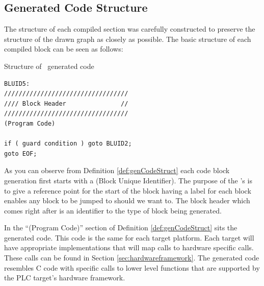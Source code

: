 \subsection{Generated Code Structure}
\label{sec:implementation:struct}
The structure of each compiled section was carefully constructed to preserve the 
structure of the drawn graph as closely as possible. The basic structure of 
each compiled block can be seen as follows:

\begin{definition}
\label{def:genCodeStruct}
Structure of \plcchart \  generated code

\begin{lstlisting}[frame=single]
BLUID5:
//////////////////////////////////
//// Block Header               //
//////////////////////////////////
(Program Code)

if ( guard condition ) goto BLUID2;
goto EOF;
\end{lstlisting}
\end{definition}

As you can observe from Definition \ref{def:genCodeStruct} each code block
generation first starts with a  (Block Unique Identifier).
The purpose of the 's is to give a reference point for the
start of the block having a  label for each block enables
any block to be jumped to should we want to. The block header which comes 
right after is an identifier to the type of block being generated. 

In the ``(Program Code)'' section of Definition \ref{def:genCodeStruct} 
sits the generated  code. This code is the same for each target platform. 
Each  target will have appropriate implementations that will map  
calls to hardware specific calls. These calls can be found in Section \ref{sec:hardwareframework}. 
The generated  code resembles C code with specific calls to lower level 
functions that are supported by the PLC target's hardware framework.

